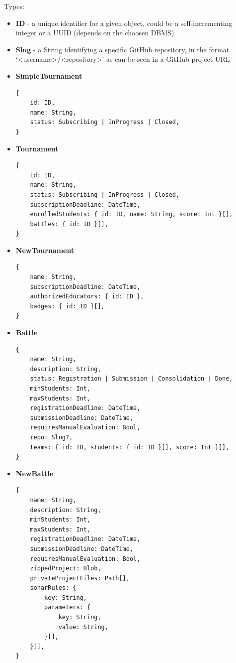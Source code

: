 Types:
\begin{itemize}
    \item \textbf{ID} {-} a unique identifier for a given object, could be a self-incrementing integer or a UUID (depends on the choosen DBMS)
    \item \textbf{Slug} {-} a String identifying a specific GitHub repository, in the format `<username>/<repository>' as can be seen
          in a GitHub project URL
    \item \textbf{SimpleTournament}
          \begin{lstlisting}
{
    id: ID,
    name: String,
    status: Subscribing | InProgress | Closed,
} 
          \end{lstlisting}
    \item \textbf{Tournament}
          \begin{lstlisting}
{
    id: ID,
    name: String,
    status: Subscribing | InProgress | Closed,
    subscriptionDeadline: DateTime,
    enrolledStudents: { id: ID, name: String, score: Int }[],
    battles: { id: ID }[],
} 
          \end{lstlisting}
    \item \textbf{NewTournament}
          \begin{lstlisting}
{
    name: String,
    subscriptionDeadline: DateTime,
    authorizedEducators: { id: ID },
    badges: { id: ID }[],
} 
          \end{lstlisting}
    \item \textbf{Battle}
          \begin{lstlisting}
{
    name: String,
    description: String,
    status: Registration | Submission | Consolidation | Done,
    minStudents: Int,
    maxStudents: Int,
    registrationDeadline: DateTime,
    submissionDeadline: DateTime,
    requiresManualEvaluation: Bool,
    repo: Slug?,
    teams: { id: ID, students: { id: ID }[], score: Int }[],
} 
          \end{lstlisting}
    \item \textbf{NewBattle}
          \begin{lstlisting}
{
    name: String,
    description: String,
    minStudents: Int,
    maxStudents: Int,
    registrationDeadline: DateTime,
    submissionDeadline: DateTime,
    requiresManualEvaluation: Bool,
    zippedProject: Blob,
    privateProjectFiles: Path[],
    sonarRules: {
        key: String,
        parameters: {
            key: String,
            value: String,
        }[],
    }[],
}
          \end{lstlisting}

\end{itemize}
